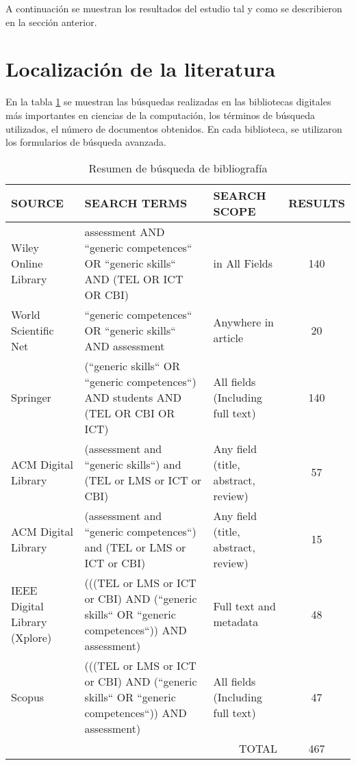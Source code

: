 


A continuación se muestran los resultados del estudio tal y como se describieron en la sección anterior.

\section{Localización de la literatura}
En la tabla \ref{tab:ResumenBusquedaResultados} se muestran las búsquedas realizadas en las bibliotecas digitales más importantes en ciencias de la computación, los términos de búsqueda utilizados, el número de documentos obtenidos. En cada biblioteca, se utilizaron los formularios de búsqueda avanzada.

\begin{table}[H]
  \begin{center}
  \begin{tabular}{| m{3.5cm} | m{6cm} | m{3cm} | c |}
    \hline
    SOURCE & SEARCH TERMS & SEARCH SCOPE & RESULTS\\
    \hline
    \hline
    Wiley Online Library & assessment AND ``generic competences`` OR ``generic skills`` AND (TEL OR ICT OR CBI) & in All Fields & 140 \\
    \hline
    World Scientific Net & ``generic competences`` OR ``generic skills`` AND assessment & Anywhere in article & 20\\
    \hline
    Springer & (``generic skills`` OR ``generic competences``) AND  students AND (TEL OR CBI OR ICT) & All fields (Including full text) & 140\\
    \hline
    ACM Digital Library & (assessment and ``generic skills``) and (TEL or LMS or ICT or CBI) & Any field (title, abstract, review) & 57\\
    \hline
    ACM Digital Library & (assessment and ``generic competences``) and (TEL or LMS or ICT or CBI) & Any field (title, abstract, review) & 15\\
    \hline
    IEEE Digital Library (Xplore) & (((TEL or LMS or ICT or CBI) AND (``generic skills`` OR ``generic competences``)) AND assessment) & Full text and metadata & 48\\
    \hline
    Scopus & (((TEL or LMS or ICT or CBI) AND (``generic skills`` OR ``generic competences``)) AND assessment) & All fields (Including full text) & 47\\
    \hline
    \multicolumn{3}{|r|}{TOTAL} & 467\\
    \hline
  \end{tabular}
\end{center}
\caption{Resumen de búsqueda de bibliografía}
\label{tab:ResumenBusquedaResultados}
\end{table} 


